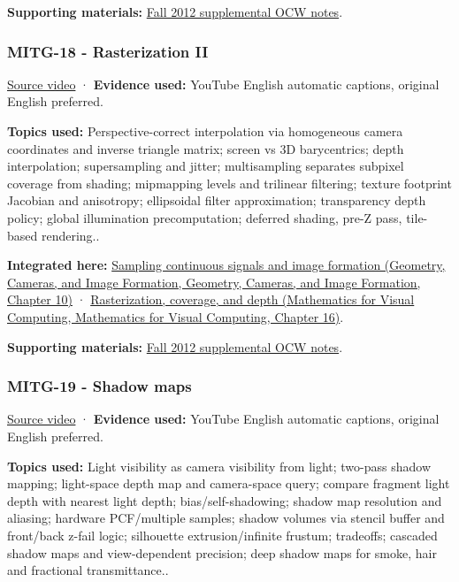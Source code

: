 \textbf{Supporting materials:} \href{https://ocw.mit.edu/courses/6-837-computer-graphics-fall-2012/pages/lecture-notes/}{Fall 2012 supplemental OCW notes}.

\subsubsection{MITG-18 - Rasterization II}\label{04-visual-computing-ii-ch036-mitg-18---rasterization-ii}

\href{https://www.youtube.com/watch?v=bZAu7QtyYvo}{Source video} · \textbf{Evidence used:} YouTube English automatic captions, original English preferred.

\textbf{Topics used:} Perspective-correct interpolation via homogeneous camera coordinates and inverse triangle matrix; screen vs 3D barycentrics; depth interpolation; supersampling and jitter; multisampling separates subpixel coverage from shading; mipmapping levels and trilinear filtering; texture footprint Jacobian and anisotropy; ellipsoidal filter approximation; transparency depth policy; global illumination precomputation; deferred shading, pre-Z pass, tile-based rendering..

\textbf{Integrated here:} \href{../03-Geometry-Cameras-and-Image-Formation/main.pdf\#nameddest=03-visual-computing-i-ch003-sampling-continuous-signals-and-image-formation}{Sampling continuous signals and image formation (Geometry, Cameras, and Image Formation, Geometry, Cameras, and Image Formation, Chapter 10)} · \href{../02-Mathematics-for-Visual-Computing/main.pdf\#nameddest=03-visual-computing-i-ch012-rasterization-coverage-and-depth}{Rasterization, coverage, and depth (Mathematics for Visual Computing, Mathematics for Visual Computing, Chapter 16)}.

\textbf{Supporting materials:} \href{https://ocw.mit.edu/courses/6-837-computer-graphics-fall-2012/pages/lecture-notes/}{Fall 2012 supplemental OCW notes}.

\subsubsection{MITG-19 - Shadow maps}\label{04-visual-computing-ii-ch036-mitg-19---shadow-maps}

\href{https://www.youtube.com/watch?v=jDw_EbXv-1I}{Source video} · \textbf{Evidence used:} YouTube English automatic captions, original English preferred.

\textbf{Topics used:} Light visibility as camera visibility from light; two-pass shadow mapping; light-space depth map and camera-space query; compare fragment light depth with nearest light depth; bias/self-shadowing; shadow map resolution and aliasing; hardware PCF/multiple samples; shadow volumes via stencil buffer and front/back z-fail logic; silhouette extrusion/infinite frustum; tradeoffs; cascaded shadow maps and view-dependent precision; deep shadow maps for smoke, hair and fractional transmittance..

